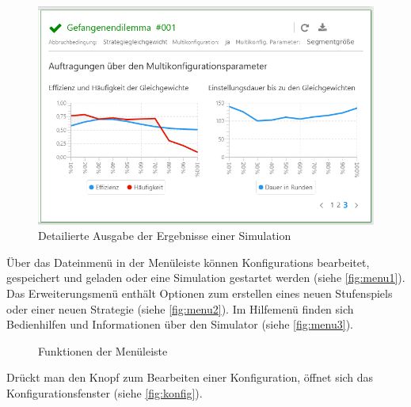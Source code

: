 \documentclass[parskip=full,11pt]{scrartcl}
\begin{document}
\begin{figure}[H]
	\centering
	\includegraphics[width=\textwidth]{images/home_out_multi_3.png}
	\caption{\label{fig:home_out_3}
		Detailierte Ausgabe der Ergebnisse einer Simulation}
\end{figure}

Über das Dateinmenü in der Menüleiste können \Glspl{Konfiguration} bearbeitet, gespeichert und geladen oder eine Simulation gestartet werden (siehe \cref{fig:menu1}).
Das Erweiterungsmenü enthält Optionen zum erstellen eines neuen \Gls{Stufenspiel}s oder einer neuen \Gls{Strategie} (siehe \cref{fig:menu2}). Im Hilfemenü finden sich Bedienhilfen und Informationen über den Simulator (siehe \cref{fig:menu3}).

\begin{figure}[ht]
	\centering
	\qquad
	\qquad
	\caption{\label{fig:menu}
		Funktionen der Menüleiste
	}
\end{figure}
\newpage
Drückt man den Knopf zum Bearbeiten einer \Gls{Konfiguration}, öffnet sich das Konfigurationsfenster (siehe \cref{fig:konfig}).
\end{document}

